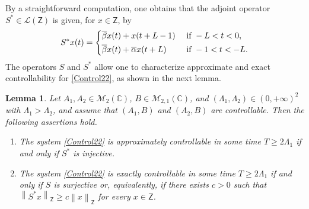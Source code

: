 \documentclass[10pt]{article}
\theoremstyle{plain}
\newtheorem{lemm}[theo]{Lemma}
\theoremstyle{definition}
\newcommand{\norm}[1]{\left\lVert #1\right\lVert}
\numberwithin{equation}{section}\numberwithin{figure}{section}\emergencystretch=3em
\begin{document}
By a straightforward computation, one obtains that the adjoint operator $S^\ast \in \mathcal L(\mathsf Z)$ is given, for $x \in \mathsf Z$, by
\begin{equation}
\label{SAst}
S^\ast x(t) =
\begin{dcases}
\overline\beta x(t) + x(t + L - 1) & \text{ if } -L < t < 0, \\
\overline\beta x(t) + \overline\alpha x(t + L) & \text{ if } -1 < t < -L.
\end{dcases}
\end{equation}
The operators $S$ and $S^\ast$ allow one to characterize approximate and exact controllability for \eqref{Control22}, as shown in the next lemma.

\begin{lemm}
\label{LemmS}
Let $A_1, A_2 \in \mathcal M_2(\mathbb C)$, $B \in \mathcal M_{2, 1}(\mathbb C)$, and $(\Lambda_1, \Lambda_2) \in (0, +\infty)^2$ with $\Lambda_1 > \Lambda_2$, and assume that $(A_1, B)$ and $(A_2, B)$ are controllable. Then the following assertions hold.
\begin{enumerate}
\item\label{Syst22SInj} The system \eqref{Control22} is approximately controllable in some time $T \geq 2 \Lambda_1$ if and only if $S^\ast$ is injective.

\item\label{Syst22SAstSurj} The system \eqref{Control22} is exactly controllable in some time $T \geq 2 \Lambda_1$ if and only if $S$ is surjective or, equivalently, if there exists $c > 0$ such that $\norm{S^\ast x}_{\mathsf Z} \geq c \norm{x}_{\mathsf Z}$ for every $x \in \mathsf Z$.
\end{enumerate}
\end{lemm}
\end{document}
